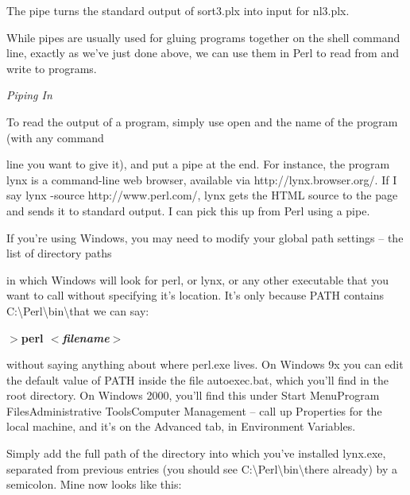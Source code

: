 \documentclass[a4paper,11pt]{book}
\begin{document}
\noindent The pipe turns the standard output of sort3.plx into input for nl3.plx.

\noindent 

\noindent While pipes are usually used for gluing programs together on the shell command line, exactly as we've just done above, we can use them in Perl to read from and write to programs.

\noindent 

\noindent \textit{Piping In}

\noindent To read the output of a program, simply use open and the name of the program (with any command

\noindent line you want to give it), and put a pipe at the end. For instance, the program lynx is a command-line web browser, available via http://lynx.browser.org/. If I say lynx -source http://www.perl.com/, lynx gets the HTML source to the page and sends it to standard output. I can pick this up from Perl using a pipe.

\noindent 

\noindent If you're using Windows, you may need to modify your global path settings -- the list of directory paths

\noindent in which Windows will look for perl, or lynx, or any other executable that you want to call without specifying it's location. It's only because PATH contains C:\textbackslash Perl\textbackslash bin\textbackslash  that we can say:

\noindent 

\noindent $>$\textbf{perl $<$\textit{filename}$>$}

\noindent 

\noindent without saying anything about where perl.exe lives. On Windows 9x you can edit the default value of PATH inside the file autoexec.bat, which you'll find in the root directory. On Windows 2000, you'll find this under Start Menu\textbar Program Files\textbar Administrative Tools\textbar Computer Management -- call up Properties for the local machine, and it's on the Advanced tab, in Environment Variables.

\noindent 

\noindent Simply add the full  path of the  directory  into  which  you've  installed  lynx.exe,  separated  from previous entries (you  should see  C:\textbackslash Perl\textbackslash bin\textbackslash  there  already)  by  a  semicolon.  Mine  now  looks like this:

\noindent 

\noindent 
\end{document}
